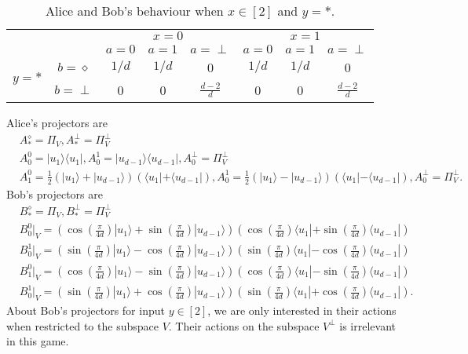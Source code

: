 \documentclass[11pt,letterpaper]{article}
\newcommand{\ket}[1]{|#1\rangle}
\newcommand{\bra}[1]{\langle#1|}
\newcommand{\ketbra}[2]{|#1\rangle\langle#2|}
\newcommand{\1}{\mathbb{1}}
\theoremstyle{definition}
\begin{document}
\begin{table}[H]
\begin{center}
\begin{tabular}{|c|c||c|c|c|c|c|c|}
\hline
\multicolumn{2}{|c|}{} &
\multicolumn{3}{|c|}{$x=0$}&
\multicolumn{3}{|c|}{$x=1$} \\
\cline{3-8}
\multicolumn{2}{|c|}{} &
$a = 0$ & $a=1$ & $a=\perp$ &
$a = 0$ & $a=1$ & $a=\perp$\\
\hline
\hline
\multirow{2}{*}{$y = \ast$} & $b=\diamond$ & $1/d$ & $1/d$ & 0 
& $1/d$ & $1/d$ & 0 \\
\cline{2-8}
&$b=\perp$ & 0 & 0 & $\frac{d-2}{d}$ 
&  0 & 0 & \small $\frac{d-2}{d} $  \\
\hline
\end{tabular}
\end{center}
\caption{Alice and Bob's behaviour when $x\in [2]$ and $y = \ast$.}
\end{table}
Alice's projectors are 
\begin{align*}
	&A_\ast^\diamond = \Pi_V, A_\ast^\perp = \Pi_V^\perp \\
	&A_0^0 = \ketbra{u_1}{u_1}, A_0^1 = \ketbra{u_{d-1}}{u_{d-1}}, A_0^\perp = \Pi_V^\perp\\
	&A_1^0 = \frac{1}{2}(\ket{u_1}+\ket{u_{d-1}})(\bra{u_1}+\bra{u_{d-1}}), 
	A_0^1 = \frac{1}{2}(\ket{u_1}-\ket{u_{d-1}})(\bra{u_1}-\bra{u_{d-1}}),A_0^\perp = \Pi_V^\perp.
\end{align*}
Bob's projectors are 
\begin{align*}
	&B_\ast^\diamond = \Pi_V, B_\ast^\perp = \Pi_V^\perp \\
	&B_0^0|_V = \left( \cos(\frac{\pi}{4d})\ket{u_1} + \sin(\frac{\pi}{4d})\ket{u_{d-1}}\right)
	\left( \cos(\frac{\pi}{4d})\bra{u_1} + \sin(\frac{\pi}{4d})\bra{u_{d-1}}\right)\\
	&B_0^1|_V = \left( \sin(\frac{\pi}{4d})\ket{u_1} - \cos(\frac{\pi}{4d})\ket{u_{d-1}}\right)
	\left( \sin(\frac{\pi}{4d})\bra{u_1} - \cos(\frac{\pi}{4d})\bra{u_{d-1}}\right)\\
	&B_1^0|_V = \left( \cos(\frac{\pi}{4d})\ket{u_1} - \sin(\frac{\pi}{4d})\ket{u_{d-1}}\right)
	\left( \cos(\frac{\pi}{4d})\bra{u_1} - \sin(\frac{\pi}{4d})\bra{u_{d-1}}\right)\\
	&B_0^1|_V = \left( \sin(\frac{\pi}{4d})\ket{u_1} + \cos(\frac{\pi}{4d})\ket{u_{d-1}}\right)
	\left( \sin(\frac{\pi}{4d})\bra{u_1} + \cos(\frac{\pi}{4d})\bra{u_{d-1}}\right).
\end{align*}
About Bob's projectors for input $y \in [2]$, we are only interested in their actions when restricted 
to the subspace $V$. Their actions on the subspace $V^\perp$ is irrelevant in this game.
\end{document}
